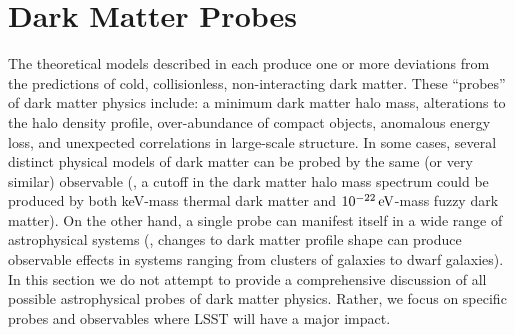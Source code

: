 \section{Dark Matter Probes}
\label{sec:probes}

The theoretical models described in  each produce one or more deviations from the predictions of cold, collisionless, non-interacting dark matter.
These ``probes'' of dark matter physics include: a minimum dark matter halo mass, alterations to the halo density profile, over-abundance of compact objects, anomalous energy loss, and unexpected correlations in large-scale structure.
In some cases, several distinct physical models of dark matter can be probed by the same (or very similar) observable (\eg, a cutoff in the dark matter halo mass spectrum could be produced by both keV-mass thermal dark matter and $10^{-22}\mathrm{\,eV}$-mass fuzzy dark matter). 
On the other hand, a single probe can manifest itself in a wide range of astrophysical systems (\eg, changes to dark matter profile shape can produce observable effects in systems ranging from clusters of galaxies to dwarf galaxies).
In this section we do not attempt to provide a comprehensive discussion of all possible astrophysical probes of dark matter physics.
Rather, we focus on specific probes and observables where LSST will have a major impact.






